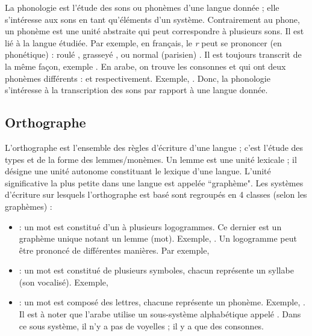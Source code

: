 \documentclass{KodeBook}
\begin{document}
La phonologie est l'étude des sons ou phonèmes d'une langue donnée ; elle s'intéresse aux sons en tant qu'éléments d'un système. 
Contrairement au phone, un phonème est une unité abstraite qui peut correspondre à plusieurs sons.
Il est lié à la langue étudiée. 
Par exemple, en français, le \textit{r} peut se prononcer (en phonétique) : roulé \expword{\textipa{[r]}}, grasseyé \expword{\textipa{[\;R]}}, ou normal (parisien) \expword{\textipa{[K]}}. 
Il est toujours transcrit de la même façon, exemple . 
En arabe, on trouve les consonnes  et  qui ont deux phonèmes différents :  et  respectivement. 
Exemple, . 
Donc, la phonologie s'intéresse à la transcription des sons par rapport à une langue donnée.

\subsection{Orthographe}

L'orthographe est l'ensemble des règles d'écriture d'une langue ; c'est l'étude des types et de la forme des lemmes/monèmes. 
Un lemme est une unité lexicale ; il désigne une unité autonome constituant le lexique d'une langue.
L'unité significative la plus petite dans une langue est appelée ``graphème".
Les systèmes d'écriture sur lesquels l'orthographe est basé sont regroupés en 4 classes (selon les graphèmes) : 
\begin{itemize}
	\item {} : un mot est constitué d'un à plusieurs logogrammes.
	Ce dernier est un graphème unique notant un lemme (mot).
	Exemple, .
	Un logogramme peut être prononcé de différentes manières. 
	Par exemple, 
	
	\item {} : un mot est constitué de plusieurs symboles, chacun représente un syllabe (son vocalisé). 
	Exemple, 
	
	\item {} : un mot est composé des lettres, chacune représente un phonème. 
	Exemple, . 
	Il est à noter que l'arabe utilise un sous-système alphabétique appelé . 
	Dans ce sous système, il n'y a pas de voyelles ; il y a que des consonnes.
\end{itemize}
\end{document}
